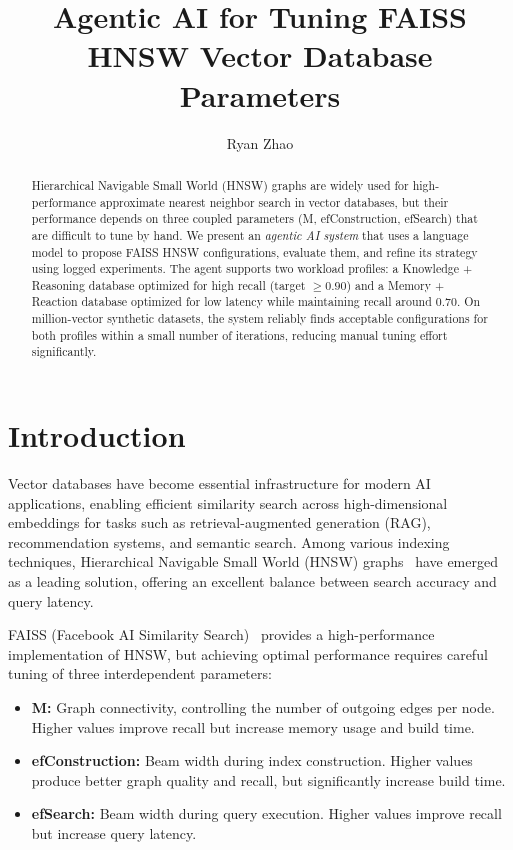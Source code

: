 \documentclass{article}
\title{\textbf{Agentic AI for Tuning FAISS HNSW Vector Database Parameters}}
\author{Ryan Zhao}
\begin{document}
\maketitle

\begin{abstract}
Hierarchical Navigable Small World (HNSW) graphs are widely used for high-performance approximate nearest neighbor search in vector databases, but their performance depends on three coupled parameters (M, efConstruction, efSearch) that are difficult to tune by hand. We present an \emph{agentic AI system} that uses a language model to propose FAISS HNSW configurations, evaluate them, and refine its strategy using logged experiments. The agent supports two workload profiles: a Knowledge + Reasoning database optimized for high recall (target $\geq 0.90$) and a Memory + Reaction database optimized for low latency while maintaining recall around $0.70$. On million-vector synthetic datasets, the system reliably finds acceptable configurations for both profiles within a small number of iterations, reducing manual tuning effort significantly.
\end{abstract}

\section{Introduction}

Vector databases have become essential infrastructure for modern AI applications, enabling efficient similarity search across high-dimensional embeddings for tasks such as retrieval-augmented generation (RAG), recommendation systems, and semantic search. Among various indexing techniques, Hierarchical Navigable Small World (HNSW) graphs~\cite{malkov2018efficientrobustapproximatenearest} have emerged as a leading solution, offering an excellent balance between search accuracy and query latency.

FAISS (Facebook AI Similarity Search)~\cite{johnson2017billionscalesimilaritysearchgpus,faiss} provides a high-performance implementation of HNSW, but achieving optimal performance requires careful tuning of three interdependent parameters:

\begin{itemize}
    \item \textbf{M:} Graph connectivity, controlling the number of outgoing edges per node. Higher values improve recall but increase memory usage and build time.
    \item \textbf{efConstruction:} Beam width during index construction. Higher values produce better graph quality and recall, but significantly increase build time.
    \item \textbf{efSearch:} Beam width during query execution. Higher values improve recall but increase query latency.
\end{itemize}
\end{document}
